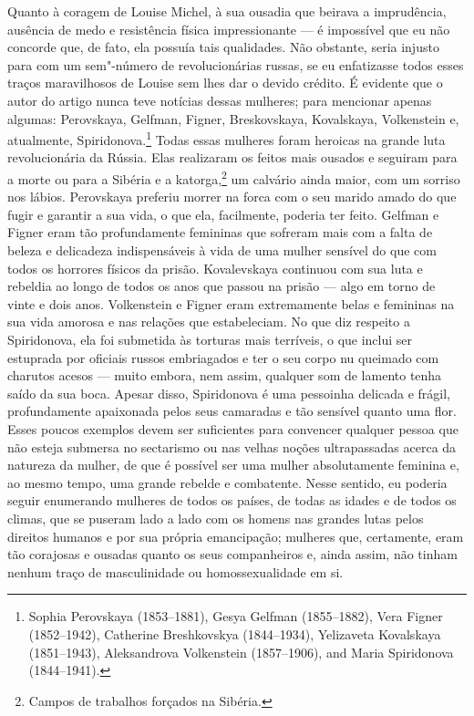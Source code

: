 Quanto à coragem de Louise Michel, à sua ousadia que beirava a
imprudência, ausência de medo e resistência física impressionante --- é
impossível que eu não concorde que, de fato, ela possuía tais
qualidades. Não obstante, seria injusto para com um sem"-número de
revolucionárias russas, se eu enfatizasse todos esses traços
maravilhosos de Louise sem lhes dar o devido crédito. É evidente que o
autor do artigo nunca teve notícias dessas mulheres; para mencionar
apenas algumas: Perovskaya, Gelfman, Figner, Breskovskaya, Kovalskaya,
Volkenstein e, atualmente, Spiridonova.\footnote{Sophia Perovskaya (1853--1881),
  Gesya Gelfman (1855--1882), Vera Figner (1852--1942), Catherine Breshkovskya (1844--1934), Yelizaveta
  Kovalskaya (1851--1943), Aleksandrova Volkenstein (1857--1906), and Maria Spiridonova (1844--1941).} Todas essas
mulheres foram heroicas na grande luta revolucionária da Rússia. Elas
realizaram os feitos mais ousados ​​e seguiram para a morte ou para a
Sibéria e a katorga,\footnote{Campos de trabalhos forçados na Sibéria.}
um calvário ainda maior, com um sorriso nos lábios. Perovskaya preferiu
morrer na forca com o seu marido amado do que fugir e garantir a sua
vida, o que ela, facilmente, poderia ter feito. Gelfman e Figner eram
tão profundamente femininas que sofreram mais com a falta de beleza e
delicadeza indispensáveis à vida de uma mulher sensível do que com todos
os horrores físicos da prisão. Kovalevskaya continuou com sua luta e rebeldia
ao longo de todos os anos que passou na prisão --- algo em torno de vinte
e dois anos. Volkenstein e Figner eram extremamente belas e femininas na
sua vida amorosa e nas relações que estabeleciam. No que diz respeito a
Spiridonova, ela foi submetida às torturas mais terríveis, o que inclui
ser estuprada por oficiais russos embriagados e ter o seu corpo nu
queimado com charutos acesos --- muito embora, nem assim, qualquer som
de lamento tenha saído da sua boca. Apesar disso, Spiridonova é uma pessoinha delicada e
frágil, profundamente apaixonada pelos seus camaradas e tão sensível
quanto uma flor. Esses poucos exemplos devem ser suficientes para
convencer qualquer pessoa que não esteja submersa no sectarismo ou nas
velhas noções ultrapassadas acerca da natureza da mulher, de que é possível ser
uma mulher absolutamente feminina e, ao mesmo tempo, uma grande rebelde
e combatente. Nesse sentido, eu poderia seguir enumerando mulheres de
todos os países, de todas as idades e de todos os climas, que se puseram
lado a lado com os homens nas grandes lutas pelos direitos humanos e
por sua própria emancipação; mulheres que, certamente, eram tão corajosas e
ousadas quanto os seus companheiros e, ainda assim, não tinham nenhum
traço de masculinidade ou homossexualidade em si.


